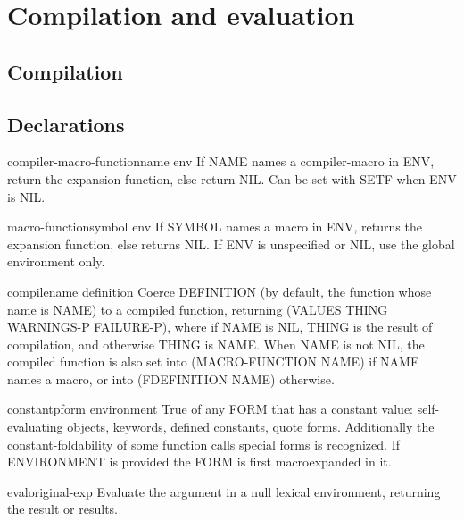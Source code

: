 \chapter{Compilation and evaluation}

\section{Compilation}

\section{Declarations}

\begin{accessor}{compiler-macro-function}{name \op env}
  If NAME names a compiler-macro in ENV, return the expansion function, else
return NIL. Can be set with SETF when ENV is NIL.
\end{accessor}

\begin{accessor}{macro-function}{symbol \op env}
  If SYMBOL names a macro in ENV, returns the expansion function,
else returns NIL. If ENV is unspecified or NIL, use the global environment
only.
\end{accessor}

\begin{function}{compile}{name \op definition}
  Coerce DEFINITION (by default, the function whose name is NAME)
  to a compiled function, returning (VALUES THING WARNINGS-P FAILURE-P),
  where if NAME is NIL, THING is the result of compilation, and
  otherwise THING is NAME. When NAME is not NIL, the compiled function
  is also set into (MACRO-FUNCTION NAME) if NAME names a macro, or into
  (FDEFINITION NAME) otherwise.
\end{function}

\begin{function}{constantp}{form \op environment}
  True of any FORM that has a constant value: self-evaluating objects,
keywords, defined constants, quote forms. Additionally the
constant-foldability of some function calls special forms is recognized. If
ENVIRONMENT is provided the FORM is first macroexpanded in it.
\end{function}

\begin{function}{eval}{original-exp}
  Evaluate the argument in a null lexical environment, returning the
   result or results.
\end{function}

